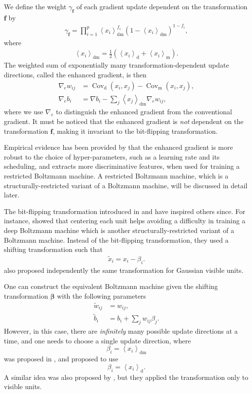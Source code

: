 \documentclass{now}
\newcommand{\vect}[1]{\mathbf{#1}}
\newcommand{\vects}[1]{\boldsymbol{#1}}
\newcommand{\cov}[0]{\operatorname{Cov}}
\newcommand{\vf}[0]{\vect{f}}
\newcommand{\td}[0]{\text{d}}
\newcommand{\vbeta}[0]{\vects{\beta}}
\newcommand{\tf}[0]{\text{m}}
\newcommand{\tdf}[0]{\text{dm}}
\newcommand{\alert}[1]{\textcolor{red}{#1}}
\newcommand{\citepub}[1]{\alert{#1}}
\begin{document}
We define the weight $\gamma_{\vf}$ of each gradient update dependent on the
transformation $\vf$ by
\begin{align*}
    \gamma_{\vf}  = \prod_{i=1}^p \left< x_i
    \right>_{\tdf}^{f_i} \left(1 - \left< x_i
    \right>_{\tdf}\right)^{1 - f_i},
\end{align*}
where 
\begin{align}
    \label{eq:tfdstat}
\left< x_i \right>_{\tdf} = \frac{1}{2} \left( \left< x_i
\right>_{\td} + \left< x_i \right>_{\tf}\right).
\end{align}
The weighted sum of exponentially many transformation-dependent update
directions, called the enhanced gradient, is then
\begin{align}
    \label{eq:enh_w}
  \nabla_e w_{ij} &=  \cov_\td(x_i,x_j)-\cov_\tf(x_i,x_j),
  \\
    \label{eq:enh_b}
  \nabla_e b_i &= \nabla b_i - \sum_j
  \left<x_j\right>_\tdf\nabla_e w_{ij},
\end{align}
where we use $\nabla_e$ to distinguish the enhanced gradient from the
conventional gradient. It must be noticed that the enhanced gradient is
\textit{not} dependent on the transformation $\vf$, making it invariant to the
bit-flipping transformation.

Empirical evidence has been provided by \citet{Cho2013nc} that the enhanced
gradient is more robust to the choice of hyper-parameters, such as a learning
rate and its scheduling, and extracts more discriminative features, when used
for training a restricted Boltzmann machine. A restricted Boltzmann machine,
which is a structurally-restricted variant of a Boltzmann machine, will be
discussed in detail later.

The bit-flipping transformation introduced in \citep{Cho2013nc} and
\citep{Cho2011icml} have inspired others since. For instance,
\citet{Montavon2012} showed that centering each unit helps avoiding a difficulty
in training a deep Boltzmann machine which is another structurally-restricted
variant of a Boltzmann machine.  Instead of the bit-flipping transformation,
they used a shifting transformation such that
\begin{align*}
    \tilde{x}_i  = x_i - \beta_i.
\end{align*}
\citet{Cho2011dlufl}
also proposed independently the same transformation for Gaussian visible units.

One can construct the equivalent Boltzmann machine given the shifting
transformation $\vbeta$ with the following parameters
\begin{align*}
    \tilde{w}_{ij} &= w_{ij}, \\
    \tilde{b}_i &= b_i + \sum_{j} w_{ij} \beta_j.
\end{align*}
However, in this case, there are \textit{infinitely} many possible update
directions at a time, and one needs to choose a single update direction, where 
\[
\beta_i = \left< x_i \right>_\tdf
\]
was proposed in \citep{Cho2013ijcnn}, and \citet{Montavon2012} proposed to use 
\[
\beta_i = \left< x_i \right>_\td.
\]
A similar idea was also proposed by \citet{Tang2011}, but they applied the
transformation only to visible units. 
\end{document}
